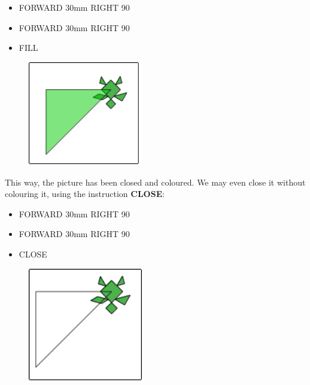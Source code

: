 \begin{scriptsize}
\begin{minipage}{0.40\textwidth}
\begin{itemize}[itemsep=-3pt,parsep=2pt]
\item[] FORWARD 30mm RIGHT 90
\item[] FORWARD 30mm RIGHT 90
\item[] FILL                  
\end{itemize}
\end{minipage}
\end{scriptsize}
\begin{minipage}{0.4\textwidth}
\begin{figure}[H]
   \includegraphics[width=5.0cm,trim=4 4 8 4,clip]{./images/disegnare/disegnare-13.png}
   \label{dis-13}
\end{figure}
\end{minipage} \hfill

\vskip 1cm

This way, the picture has been closed and coloured. We may even close it without colouring it, using the instruction 
 \textbf{CLOSE}:

\vskip 1cm

\begin{scriptsize}
\begin{minipage}{0.40\textwidth}
\begin{itemize}[itemsep=-3pt,parsep=2pt]
\item[] FORWARD 30mm RIGHT 90
\item[] FORWARD 30mm RIGHT 90
\item[] CLOSE                  
\end{itemize}
\end{minipage}
\end{scriptsize}
\begin{minipage}{0.4\textwidth}
\begin{figure}[H]
   \includegraphics[width=5.0cm,trim=4 4 8 4,clip]{./images/disegnare/disegnare-14.png}
   \label{dis-14}
\end{figure}
\end{minipage} \hfill

